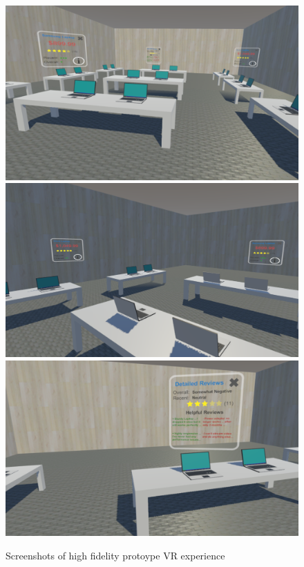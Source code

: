 \begin{figure}
	\includegraphics[width=0.9\columnwidth]{figures/3Panel}
	\includegraphics[width=0.9\columnwidth]{figures/2Panel}
	\includegraphics[width=0.9\columnwidth]{figures/DetailReviews}
	\caption{Screenshots of high fidelity protoype VR experience}
	\label{figures:HiFiScreenshots}
\end{figure}


